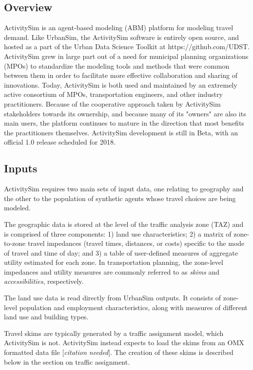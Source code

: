 \subsection{Overview}
ActivitySim is an agent-based modeling (ABM) platform for modeling travel demand. Like UrbanSim, the ActivitySim software is entirely open source, and hosted as a part of the Urban Data Science Toolkit at  https://github.com/UDST. ActivitySim grew in large part out of a need for municipal planning organizations (MPOs) to standardize the modeling tools and methods that were common between them in order to facilitate more effective collaboration and sharing of innovations. Today, ActivitySim is both used and maintained by an extremely active consortium of MPOs, transportation engineers, and other industry practitioners. Because of the cooperative approach taken by ActivitySim stakeholders towards its ownership, and because many of its "owners" are also its main users, the platform continues to mature in the direction that most benefits the practitioners themselves. ActivitySim development is still in Beta, with an official 1.0 release scheduled for 2018.

\subsection{Inputs}
ActivitySim requires two main sets of input data, one relating to geography and the other to the population of synthetic agents whose travel choices are being modeled. 
    
The geographic data is stored at the level of the traffic analysis zone (TAZ) and is comprised of three components: 1) land use characteristics; 2) a matrix of zone-to-zone travel impedances (travel times, distances, or costs) specific to the mode of travel and time of day; and 3) a table of user-defined measures of aggregate utility estimated for each zone. In transportation planning, the zone-level impedances and utility measures are commonly referred to as \textit{skims} and \textit{accessibilities}, respectively. 

The land use data is read directly from UrbanSim outputs. It consists of zone-level population and employment characteristics, along with measures of different land use and building types.

Travel skims are typically generated by a traffic assignment model, which ActivitySim is not. ActivitySim instead expects to load the skims from an OMX formatted data file [\textit{citation needed}]. The creation of these skims is described below in the section on traffic assignment.

